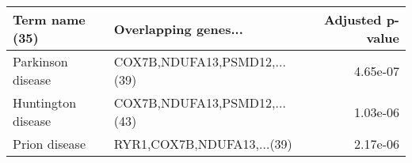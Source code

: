 \begin{tabular}{llr}
\toprule
    Term name (35) &         Overlapping genes... &  Adjusted p-value \\
\midrule
 Parkinson disease & COX7B,NDUFA13,PSMD12,...(39) &          4.65e-07 \\
Huntington disease & COX7B,NDUFA13,PSMD12,...(43) &          1.03e-06 \\
     Prion disease &   RYR1,COX7B,NDUFA13,...(39) &          2.17e-06 \\
\bottomrule
\end{tabular}
